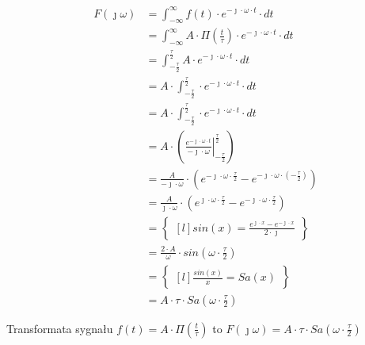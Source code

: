 \begin{task}
\begin{equation}
\begin{aligned}
F(\jmath \omega )&=\int_{-\infty }^{\infty}f(t) \cdot e^{-\jmath \cdot \omega \cdot t}\cdot dt\\
&=\int_{-\infty }^{\infty} A\cdot\Pi(\frac{t}{\tau})  \cdot e^{-\jmath \cdot \omega \cdot t}\cdot dt\\
&=\int_{-\frac{\tau}{2} }^{\frac{\tau}{2}} A\cdot e^{-\jmath \cdot \omega \cdot t}\cdot dt\\
&=A\cdot \int_{-\frac{\tau}{2} }^{\frac{\tau}{2}} \cdot e^{-\jmath \cdot \omega \cdot t}\cdot dt\\
&=A\cdot \int_{-\frac{\tau}{2} }^{\frac{\tau}{2}} \cdot e^{-\jmath \cdot \omega \cdot t}\cdot dt\\
&=A\cdot \left(\left. \frac{e^{-\jmath \cdot \omega \cdot t}}{-\jmath \cdot \omega}\right |_{-\frac{\tau}{2}}^{\frac{\tau}{2}} \right )\\
&=\frac{A}{-\jmath \cdot \omega} \cdot \left(e^{-\jmath \cdot \omega \cdot \frac{\tau}{2}} - e^{-\jmath \cdot \omega \cdot (-\frac{\tau}{2})}\right)\\
&=\frac{A}{\jmath \cdot \omega} \cdot \left(e^{\jmath \cdot \omega \cdot \frac{\tau}{2}} - e^{-\jmath \cdot \omega \cdot \frac{\tau}{2}}\right)\\
&=\begin{Bmatrix*}[l]
sin(x)=\frac{e^{\jmath \cdot x} - e^{-\jmath \cdot x}}{2 \cdot \jmath}
\end{Bmatrix*}\\
&=\frac{2 \cdot A}{\omega} \cdot sin\left(\omega \cdot \frac{\tau}{2}\right)\\
&=\begin{Bmatrix*}[l]
\frac{sin(x)}{x}=Sa(x)
\end{Bmatrix*}\\
&=A\cdot \tau \cdot Sa\left(\omega \cdot \frac{\tau}{2}\right)
\end{aligned}
\end{equation}

Transformata sygnału $f(t)=A\cdot\Pi(\frac{t}{\tau})$ to $F(\jmath \omega)=A \cdot \tau \cdot Sa\left(\omega \cdot \frac{\tau}{2}\right)$
\end{task}

